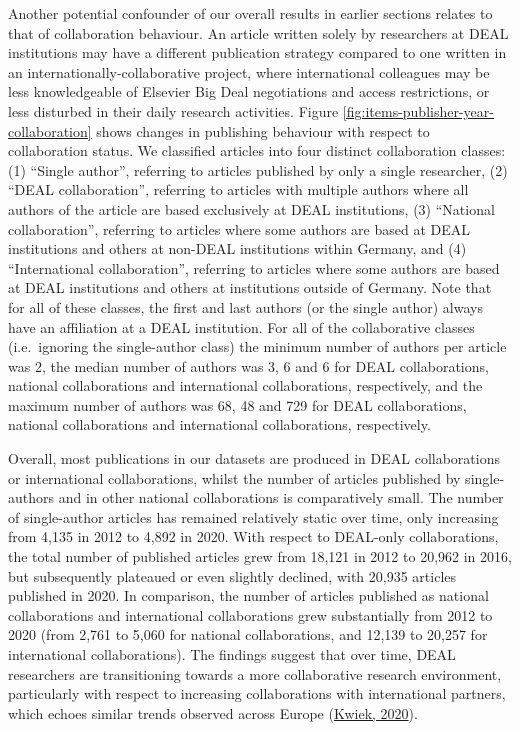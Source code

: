 \documentclass[
]{article}
\begin{document}
Another potential confounder of our overall results in earlier sections relates to that of collaboration behaviour. An article written solely by researchers at DEAL institutions may have a different publication strategy compared to one written in an internationally-collaborative project, where international colleagues may be less knowledgeable of Elsevier Big Deal negotiations and access restrictions, or less disturbed in their daily research activities. Figure \ref{fig:items-publisher-year-collaboration} shows changes in publishing behaviour with respect to collaboration status. We classified articles into four distinct collaboration classes: (1) ``Single author'', referring to articles published by only a single researcher, (2) ``DEAL collaboration'', referring to articles with multiple authors where all authors of the article are based exclusively at DEAL institutions, (3) ``National collaboration'', referring to articles where some authors are based at DEAL institutions and others at non-DEAL institutions within Germany, and (4) ``International collaboration'', referring to articles where some authors are based at DEAL institutions and others at institutions outside of Germany. Note that for all of these classes, the first and last authors (or the single author) always have an affiliation at a DEAL institution. For all of the collaborative classes (i.e.~ignoring the single-author class) the minimum number of authors per article was 2, the median number of authors was 3, 6 and 6 for DEAL collaborations, national collaborations and international collaborations, respectively, and the maximum number of authors was 68, 48 and 729 for DEAL collaborations, national collaborations and international collaborations, respectively.

Overall, most publications in our datasets are produced in DEAL collaborations or international collaborations, whilst the number of articles published by single-authors and in other national collaborations is comparatively small. The number of single-author articles has remained relatively static over time, only increasing from 4,135 in 2012 to 4,892 in 2020. With respect to DEAL-only collaborations, the total number of published articles grew from 18,121 in 2012 to 20,962 in 2016, but subsequently plateaued or even slightly declined, with 20,935 articles published in 2020. In comparison, the number of articles published as national collaborations and international collaborations grew substantially from 2012 to 2020 (from 2,761 to 5,060 for national collaborations, and 12,139 to 20,257 for international collaborations). The findings suggest that over time, DEAL researchers are transitioning towards a more collaborative research environment, particularly with respect to increasing collaborations with international partners, which echoes similar trends observed across Europe (\href{https://doi.org/10.1080/03075079.2020.1749254}{Kwiek, 2020}).
\end{document}
